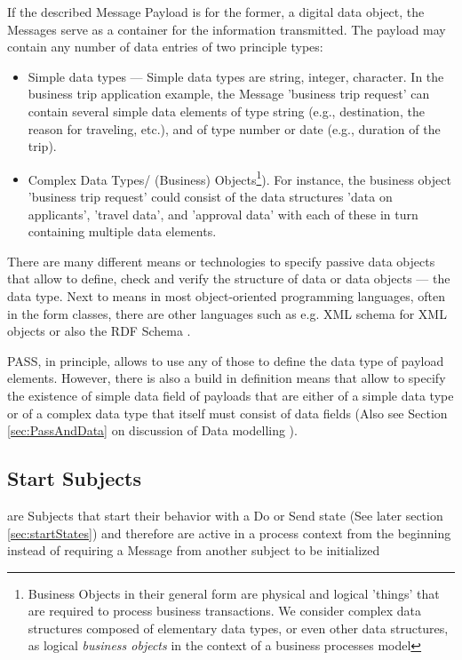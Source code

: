 If the described Message Payload is for the former, a digital data object, the Messages serve as a container for the information transmitted. The payload may contain any number of data entries of two principle types:

\begin{itemize}
	\item Simple data types --- Simple data types are string, integer, character. In the business trip application example, the Message 'business trip request' can contain several simple data elements of type string (e.g., destination, the reason for traveling, etc.), and of type number or date (e.g., duration of the trip).
	\item Complex Data Types/ (Business) Objects\footnote{Business Objects in their general form are physical and logical 'things' that are required to process business transactions. We consider complex data structures composed of elementary data types, or even other data structures, as logical \textit{business objects} in the context of a business processes model}). For instance, the business object 'business trip request' could consist of the data structures 'data on applicants', 'travel data', and 'approval data' with each of these in turn containing multiple data elements.
\end{itemize}

There are many different means or technologies to specify passive data objects that allow to define, check and verify the structure of data or data objects --- the data type. Next to means in most object-oriented programming languages, often in the form classes, there are other languages such as e.g. XML schema\cite{w3d:xmlShema} for XML objects or also the RDF Schema \cite{rdf:rdfs}.

PASS, in principle, allows to use any of those to define the data type of payload elements. However, there is also a  build in definition means that allow to specify the existence of simple data field of payloads that are either of a simple data type or of a complex data type that itself must consist of data fields
(Also see Section \ref{sec:PassAndData} on discussion of Data modelling ).

\subsection{Start Subjects}
\label{sec:startSubject}

 are Subjects that start their behavior with a Do or Send state (See later section \ref{sec:startStates}) and therefore are active in a process context from the beginning instead of requiring a Message from another subject to be initialized 

